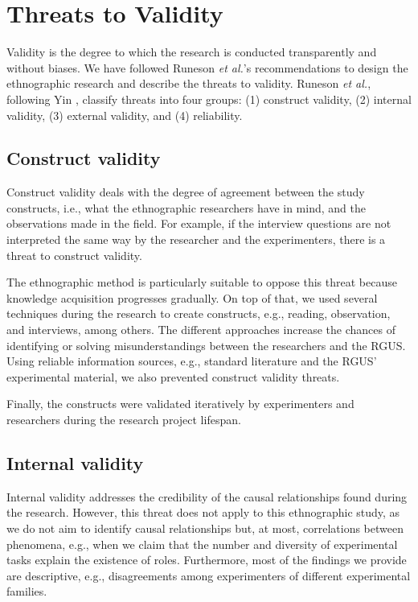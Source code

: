 \section{Threats to Validity}\label{sec-threats}
Validity is the degree to which the research is conducted transparently and without biases. We have followed Runeson \textit{et al.}'s recommendations \cite[p. 71–73]{Runenson-2012-case-study-SE} to design the ethnographic research and describe the threats to validity. Runeson \textit{et al.}, following Yin \cite{Yin-2009-case-study}, classify threats into four groups: (1) construct validity, (2) internal validity, (3) external validity, and (4) reliability.

\subsection{Construct validity}
Construct validity deals with the degree of agreement between the study constructs, i.e., what the ethnographic researchers have in mind, and the observations made in the field. For example, if the interview questions are not interpreted the same way by the researcher and the experimenters, there is a threat to construct validity. 

The ethnographic method is particularly suitable to oppose this threat because knowledge acquisition progresses gradually. On top of that, we used several techniques during the research to create constructs, e.g., reading, observation, and interviews, among others. The different approaches increase the chances of identifying or solving misunderstandings between the researchers and the RGUS. Using reliable information sources, e.g., standard literature and the RGUS' experimental material, we also prevented construct validity threats. 

Finally, the constructs were validated iteratively by experimenters and researchers during the research project lifespan.

\subsection{Internal validity}
Internal validity addresses the credibility of the causal relationships found during the research. However, this threat does not apply to this ethnographic study, as we do not aim to identify causal relationships but, at most, correlations between phenomena, e.g., when we claim that the number and diversity of experimental tasks explain the existence of roles. Furthermore, most of the findings we provide are descriptive, e.g., disagreements among experimenters of different experimental families.


